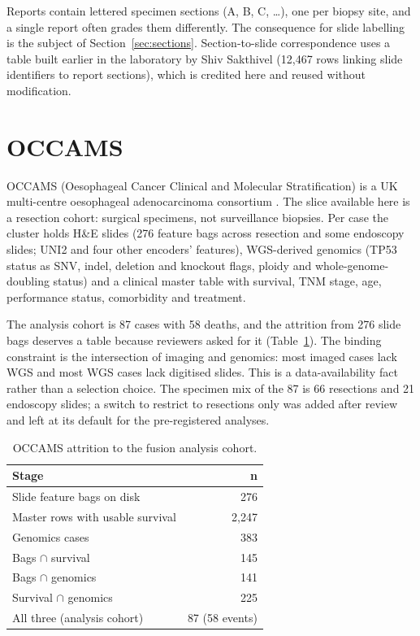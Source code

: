 Reports contain lettered specimen sections (A, B, C, \ldots), one per biopsy site, and a single report often grades them differently. The consequence for slide labelling is the subject of Section~\ref{sec:sections}. Section-to-slide correspondence uses a table built earlier in the laboratory by Shiv Sakthivel (12,467 rows linking slide identifiers to report sections), which is credited here and reused without modification.

\section{OCCAMS}
\label{sec:occams}

OCCAMS (Oesophageal Cancer Clinical and Molecular Stratification) is a UK multi-centre oesophageal adenocarcinoma consortium \citep{frankell2019}. The slice available here is a resection cohort: surgical specimens, not surveillance biopsies. Per case the cluster holds H\&E slides (276 feature bags across resection and some endoscopy slides; UNI2 and four other encoders' features), WGS-derived genomics (TP53 status as SNV, indel, deletion and knockout flags, ploidy and whole-genome-doubling status) and a clinical master table with survival, TNM stage, age, performance status, comorbidity and treatment.

The analysis cohort is 87 cases with 58 deaths, and the attrition from 276 slide bags deserves a table because reviewers asked for it (Table~\ref{tab:occams_attrition}). The binding constraint is the intersection of imaging and genomics: most imaged cases lack WGS and most WGS cases lack digitised slides. This is a data-availability fact rather than a selection choice. The specimen mix of the 87 is 66 resections and 21 endoscopy slides; a switch to restrict to resections only was added after review and left at its default for the pre-registered analyses.

\begin{table}[htbp]
\centering\small
\caption{OCCAMS attrition to the fusion analysis cohort.}
\label{tab:occams_attrition}
\begin{tabular}{@{}lr@{}}
\toprule
Stage & n \\
\midrule
Slide feature bags on disk & 276 \\
Master rows with usable survival & 2,247 \\
Genomics cases & 383 \\
Bags $\cap$ survival & 145 \\
Bags $\cap$ genomics & 141 \\
Survival $\cap$ genomics & 225 \\
All three (analysis cohort) & 87 (58 events) \\
\bottomrule
\end{tabular}
\end{table}

